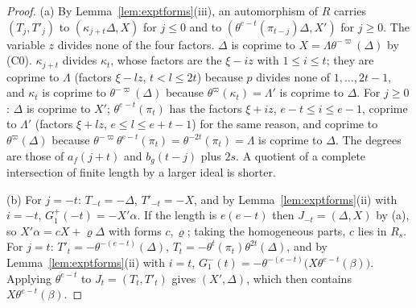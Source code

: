 \documentclass[11pt]{article}
\theoremstyle{definition}
\theoremstyle{remark}
\begin{document}
\begin{proof}
(a) By Lemma~\ref{lem:exptforms}(iii), an automorphism of $R$ carries $(T_j,T'_j)$ to $(\kappa_{j+t}\Delta,X)$ for $j\le0$ and to $(\theta^{e-t}(\pi_{t-j})\Delta,X')$ for $j\ge0$. The variable $z$ divides none of the four factors. $\Delta$ is coprime to $X=\Lambda\theta^{-\varpi}(\Delta)$ by (C0). $\kappa_{j+t}$ divides $\kappa_t$, whose factors are the $\xi-iz$ with $1\le i\le t$; they are coprime to $\Lambda$ (factors $\xi-lz$, $t<l\le2t$) because $p$ divides none of $1,\dots,2t-1$, and $\kappa_t$ is coprime to $\theta^{-\varpi}(\Delta)$ because $\theta^{\varpi}(\kappa_t)=\Lambda'$ is coprime to $\Delta$. For $j\ge0$: $\Delta$ is coprime to $X'$; $\theta^{e-t}(\pi_t)$ has the factors $\xi+iz$, $e-t\le i\le e-1$, coprime to $\Lambda'$ (factors $\xi+lz$, $e\le l\le e+t-1$) for the same reason, and coprime to $\theta^{\varpi}(\Delta)$ because $\theta^{-\varpi}\theta^{e-t}(\pi_t)=\theta^{-2t}(\pi_t)=\Lambda$ is coprime to $\Delta$. The degrees are those of $a_f(j+t)$ and $b_g(t-j)$ plus $2s$. A quotient of a complete intersection of finite length by a larger ideal is shorter.

(b) For $j=-t$: $T_{-t}=-\Delta$, $T'_{-t}=-X$, and by Lemma~\ref{lem:exptforms}(ii) with $i=-t$, $G^+_1(-t)=-X'\alpha$. If the length is $e(e-t)$ then $J_{-t}=(\Delta,X)$ by (a), so $X'\alpha=cX+\varrho\Delta$ with forms $c,\varrho$; taking the homogeneous parts, $c$ lies in $R_s$. For $j=t$: $T'_t=-\theta^{-(e-t)}(\Delta)$, $T_t=-\theta^t(\pi_t)\theta^{2t}(\Delta)$, and by Lemma~\ref{lem:exptforms}(ii) with $i=t$, $G^-_1(t)=-\theta^{-(e-t)}\bigl(X\theta^{e-t}(\beta)\bigr)$. Applying $\theta^{e-t}$ to $J_t=(T_t,T'_t)$ gives $(X',\Delta)$, which then contains $X\theta^{e-t}(\beta)$.


\end{proof}
\end{document}
